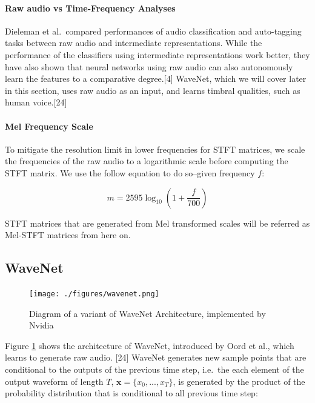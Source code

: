 \documentclass[12pt,a4paper,]{report}
\begin{document}
\paragraph{Raw audio vs Time-Frequency Analyses}

Dieleman et al.~compared performances of audio classification and
auto-tagging tasks between raw audio and intermediate representations.
While the performance of the classifiers using intermediate
representations work better, they have also shown that neural networks
using raw audio can also autonomously learn the features to a
comparative degree.{[}4{]} WaveNet, which we will cover later in this
section, uses raw audio as an input, and learns timbral qualities, such
as human voice.{[}24{]}

\paragraph{Mel Frequency Scale}

To mitigate the resolution limit in lower frequencies for STFT matrices,
we scale the frequencies of the raw audio to a logarithmic scale before
computing the STFT matrix. We use the follow equation to do so--given
frequency \(f\):

\begin{equation}
    m = 2595 \log_{10} (1 + \frac{f}{700})
\end{equation}

STFT matrices that are generated from Mel transformed scales will be
referred as Mel-STFT matrices from here on.

\hypertarget{wavenet}{%
\subsection{WaveNet}\label{wavenet}}

\begin{figure}[!h]
    \texttt{[image: ./figures/wavenet.png]}
    \centering
    \caption[Diagram of WaveNet]{Diagram of a variant of WaveNet Architecture, implemented by Nvidia} \label{fig:wavenet}
\end{figure}

Figure \ref{fig:wavenet} shows the architecture of WaveNet, introduced
by Oord et al., which learns to generate raw audio. {[}24{]} WaveNet
generates new sample points that are conditional to the outputs of the
previous time step, i.e.~the each element of the output waveform of
length \(T\), \(\mathbf{x} = \{x_0, ..., x_T\}\), is generated by the
product of the probability distribution that is conditional to all
previous time step:
\end{document}
